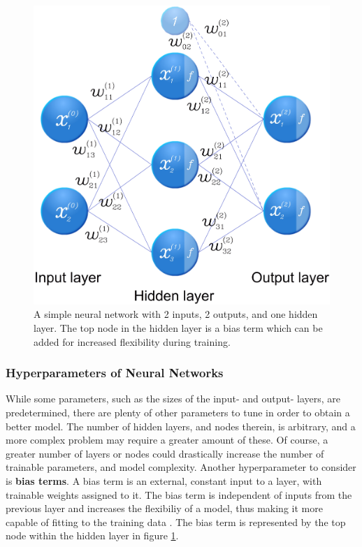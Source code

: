 \begin{figure}[h]
	\centering
	\includegraphics[scale=0.3]{figs_temp/network_graph.jpg}
	\caption{A simple neural network with 2 inputs, 2 outputs, and one hidden layer. The top node in the hidden layer is a bias term which can be added for increased flexibility during training.}
	\label{fig:ann}
\end{figure}


\subsubsection*{Hyperparameters of Neural Networks}
While some parameters, such as the sizes of the input- and output- layers, are predetermined, there are plenty of other parameters to tune in order to obtain a better model. The number of hidden layers, and nodes therein, is arbitrary, and a more complex problem may require a greater amount of these. Of course, a greater number of layers or nodes could drastically increase the number of trainable parameters, and model complexity. Another hyperparameter to consider is \textbf{bias terms}. A bias term is an external, constant input to a layer, with trainable weights assigned to it. The bias term is independent of inputs from the previous layer and increases the flexibiliy of a model, thus making it more capable of fitting to the training data \citep{kohl_2010}. The bias term is represented by the top node within the hidden layer in figure \ref{fig:ann}.

